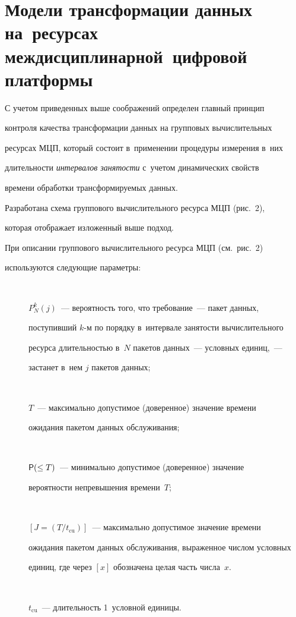 \section{Модели трансформации данных на~ресурсах междисциплинарной~цифровой платформы}

  

  С учетом приведенных выше соображений определен глав\-ный принцип 

контроля качества трансформации данных на групповых вы\-чис\-ли\-тель\-ных 

ресурсах МЦП, который со\-сто\-ит в~применении процедуры измерения в~них 

дли\-тель\-ности \textit{интервалов за\-ня\-тости} с~учетом динамических свойств 

времени обработки транс\-фор\-ми\-ру\-емых данных. 

  

  Разработана схема группового вычислительного ресурса МЦП (рис.~2), 

которая отоб\-ра\-жа\-ет изложенный выше подход.

 

  При описании группового вычислительного ресурса МЦП (см.\ рис.~2) 

используются сле\-ду\-ющие па\-ра\-метры:

  \begin{description}

  \item [\,] $P_N^k(j)$~--- вероятность того, что требование~--- пакет данных, 

по\-сту\-пив\-ший $k$-м по порядку в~интервале за\-ня\-тости вы\-чис\-ли\-тель\-но\-го 

ресурса дли\-тель\-ностью в~$N$ пакетов данных~--- условных единиц,~--- 

застанет в~нем $j$ пакетов данных;

  \item[\,] $T$~--- максимально допустимое (доверенное) значение времени 

ожидания пакетом данных обслуживания; 

  \item[\,] ${\sf P}(\leq T)$~--- минимально допустимое (доверенное) значение 

вероятности непревышения времени~$T$; 

  \item[\,] $[J=(T/t_{\mathrm{cu}})]$~--- максимально допустимое значение времени 

ожидания пакетом данных обслуживания, вы\-ра\-жен\-ное чис\-лом условных 

единиц, где через $[x]$ обозначена целая часть чис\-ла~$x$.

  \item[\,] $t_{\mathrm{cu}}$~--- длительность 1~условной единицы.

  \end{description}

